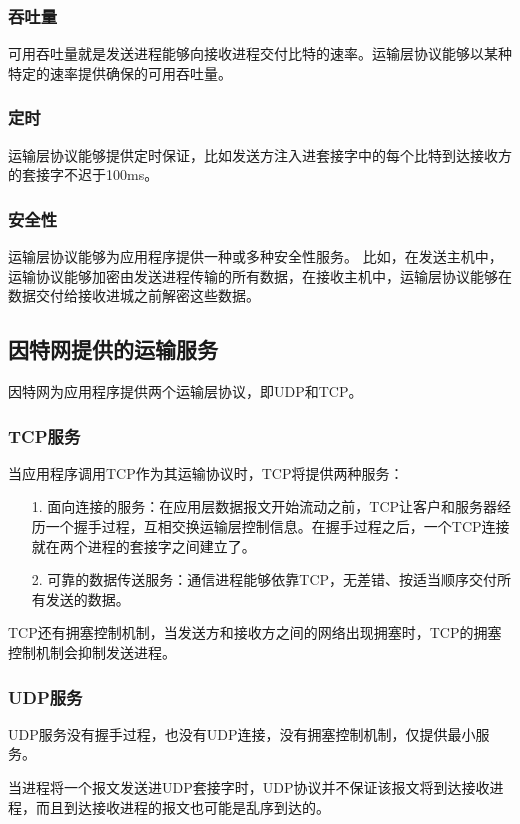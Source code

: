 \documentclass[a4paper,left=2.5cm,right=2.5cm,11pt]{article}
\begin{document}
\subsubsection{吞吐量}
	可用吞吐量就是发送进程能够向接收进程交付比特的速率。运输层协议能够以某种特定的速率提供确保的可用吞吐量。

\subsubsection{定时}
	运输层协议能够提供定时保证，比如发送方注入进套接字中的每个比特到达接收方的套接字不迟于100ms。

\subsubsection{安全性}
	运输层协议能够为应用程序提供一种或多种安全性服务。
	比如，在发送主机中，运输协议能够加密由发送进程传输的所有数据，在接收主机中，运输层协议能够在数据交付给接收进城之前解密这些数据。

\subsection{因特网提供的运输服务}
	因特网为应用程序提供两个运输层协议，即UDP和TCP。

\subsubsection{TCP服务}
	当应用程序调用TCP作为其运输协议时，TCP将提供两种服务：
	\begin{itemize}
		\item[1.] 面向连接的服务：在应用层数据报文开始流动之前，TCP让客户和服务器经历一个握手过程，互相交换运输层控制信息。在握手过程之后，一个TCP连接就在两个进程的套接字之间建立了。
		\item[2.] 可靠的数据传送服务：通信进程能够依靠TCP，无差错、按适当顺序交付所有发送的数据。
	\end{itemize}

	TCP还有拥塞控制机制，当发送方和接收方之间的网络出现拥塞时，TCP的拥塞控制机制会抑制发送进程。

\subsubsection{UDP服务}
	UDP服务没有握手过程，也没有UDP连接，没有拥塞控制机制，仅提供最小服务。\par

	当进程将一个报文发送进UDP套接字时，UDP协议并不保证该报文将到达接收进程，而且到达接收进程的报文也可能是乱序到达的。
\end{document}
